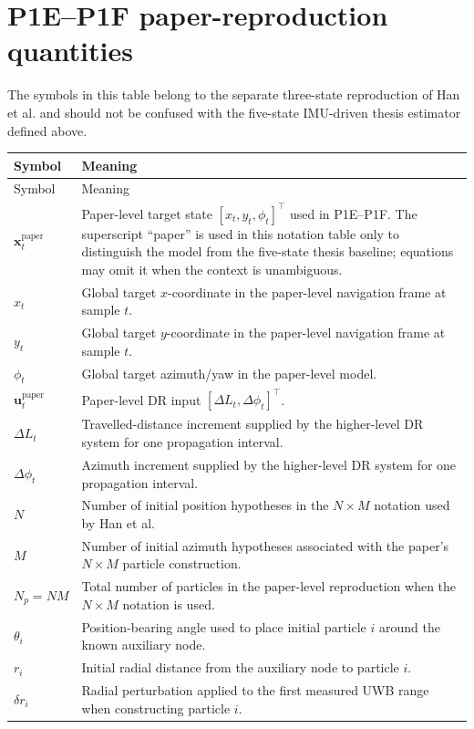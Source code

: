 \section*{P1E--P1F paper-reproduction quantities}
The symbols in this table belong to the separate three-state reproduction of Han et al. and should not be confused with the five-state IMU-driven thesis estimator defined above.
\begin{longtable}{p{}p{}}
\toprule
Symbol & Meaning\\
\midrule
\endfirsthead
\toprule
Symbol & Meaning\\
\midrule
\endhead
$\bm x_t^{\mathrm{paper}}$ & Paper-level target state $[x_t,y_t,\phi_t]^\top$ used in P1E--P1F. The superscript ``paper'' is used in this notation table only to distinguish the model from the five-state thesis baseline; equations may omit it when the context is unambiguous.\\
$x_t$ & Global target $x$-coordinate in the paper-level navigation frame at sample $t$.\\
$y_t$ & Global target $y$-coordinate in the paper-level navigation frame at sample $t$.\\
$\phi_t$ & Global target azimuth/yaw in the paper-level model.\\
$\bm u_t^{\mathrm{paper}}$ & Paper-level DR input $[\Delta L_t,\Delta\phi_t]^\top$.\\
$\Delta L_t$ & Travelled-distance increment supplied by the higher-level DR system for one propagation interval.\\
$\Delta\phi_t$ & Azimuth increment supplied by the higher-level DR system for one propagation interval.\\
$N$ & Number of initial position hypotheses in the $N\times M$ notation used by Han et al.\\
$M$ & Number of initial azimuth hypotheses associated with the paper's $N\times M$ particle construction.\\
$N_p=NM$ & Total number of particles in the paper-level reproduction when the $N\times M$ notation is used.\\
$\theta_i$ & Position-bearing angle used to place initial particle $i$ around the known auxiliary node.\\
$r_i$ & Initial radial distance from the auxiliary node to particle $i$.\\
$\delta r_i$ & Radial perturbation applied to the first measured UWB range when constructing particle $i$.\\

\end{longtable}
